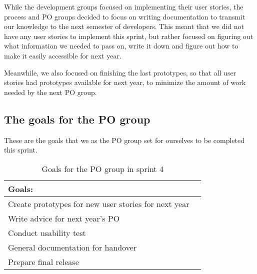 While the development groups focused on implementing their user stories, the process and PO groups decided to focus on writing documentation to transmit our knowledge to the next semester of developers.
This meant that we did not have any user stories to implement this sprint, but rather focused on figuring out what information we needed to pass on, write it down and figure out how to make it easily accessible for next year.

Meanwhile, we also focused on finishing the last prototypes, so that all user stories had prototypes available for next year, to minimize the amount of work needed by the next PO group.

\subsection{The goals for the PO group}\label{subsec:sprint-4-PO-goals}
These are the goals that we as the PO group set for ourselves to be completed this sprint.
\begin{table}[H]
    \centering
    \begin{tabular}{|l|l|}
    \hline
    Goals:  \\ \hline
     Create prototypes for new user stories for next year \\ \hline
     Write advice for next year's PO \\ \hline
     Conduct usability test \\ \hline
     General documentation for handover \\ \hline
     Prepare final release \\ \hline
    \end{tabular}
    \caption{Goals for the PO group in sprint 4}
\end{table}
